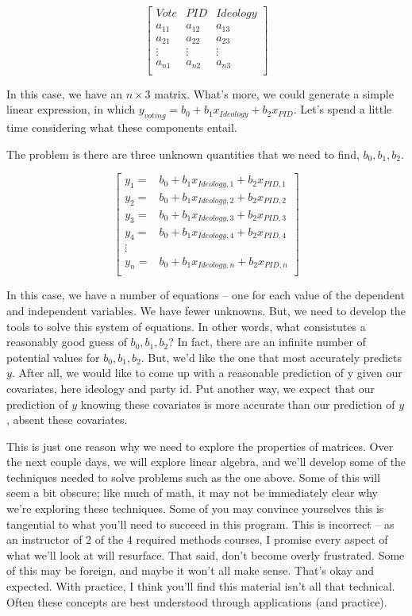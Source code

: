 \documentclass[
]{book}
\begin{document}
\[
\begin{bmatrix}
Vote&PID&Ideology \\\hline
a_{11}&a_{12}&a_{13} \\
a_{21}&a_{22}&a_{23} \\
\vdots & \vdots & \vdots\\
a_{n1}&a_{n2}&a_{n3}\\
\end{bmatrix}
\]

In this case, we have an \(n \times 3\) matrix. What's more, we could
generate a simple linear expression, in which
\(y_{voting}=b_0+b_1 x_{Ideology}+b_2 x_{PID}\). Let's spend a little time
considering what these components entail.

The problem is there are three unknown quantities that we need to find,
\(b_0, b_1, b_2\).

\[\begin{bmatrix}
y_{1}= & b_0+ b_1 x_{Ideology,1}+b_2 x_{PID,1}\\
y_{2}= & b_0+ b_1 x_{Ideology,2}+b_2 x_{PID,2}\\
y_{3}= &  b_0+ b_1 x_{Ideology,3}+b_2 x_{PID,3}\\
y_{4}= &  b_0+ b_1 x_{Ideology,4}+b_2 x_{PID,4}\\
\vdots\\
y_{n}= &  b_0+ b_1 x_{Ideology,n}+b_2 x_{PID,n}\\
\end{bmatrix}\]

In this case, we have a number of equations -- one for each value of the
dependent and independent variables. We have fewer unknowns. But, we
need to develop the tools to solve this system of equations. In other
words, what consistutes a reasonably good guess of \(b_0, b_1, b_2\)? In
fact, there are an infinite number of potential values for
\(b_0, b_1, b_2\). But, we'd like the one that most accurately predicts
\(y\). After all, we would like to come up with a reasonable prediction of
y given our covariates, here ideology and party id. Put another way, we
expect that our prediction of \(y\) knowing these covariates is more
accurate than our prediction of \(y\), absent these covariates.

This is just one reason why we need to explore the properties of
matrices. Over the next couple days, we will explore linear algebra, and
we'll develop some of the techniques needed to solve problems such as
the one above. Some of this will seem a bit obscure; like much of math,
it may not be immediately clear why we're exploring these techniques.
Some of you may convince yourselves this is tangential to what you'll
need to succeed in this program. This is incorrect -- as an instructor
of 2 of the 4 required methods courses, I promise every aspect of what
we'll look at will resurface. That said, don't become overly frustrated.
Some of this may be foreign, and maybe it won't all make sense. That's
okay and expected. With practice, I think you'll find this material
isn't all that technical. Often these concepts are best understood
through applications (and practice).
\end{document}
